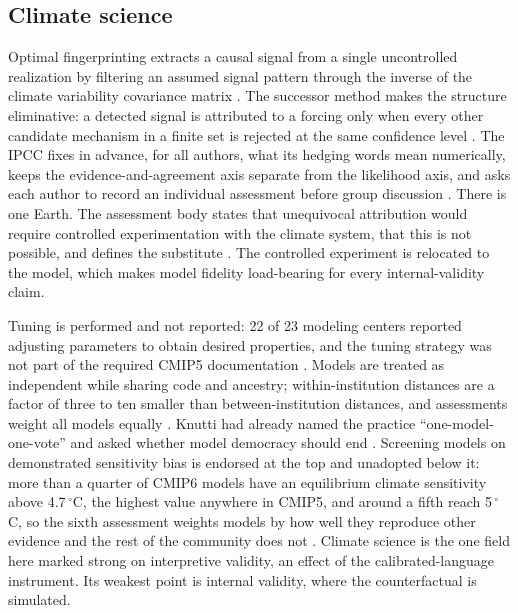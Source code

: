 \documentclass{article}
\begin{document}
\subsection{Climate science}

Optimal fingerprinting extracts a causal signal from a single uncontrolled realization by filtering an assumed signal pattern through the inverse of the climate variability covariance matrix \citep{hasselmann1993optimal}. The successor method makes the structure eliminative: a detected signal is attributed to a forcing only when every other candidate mechanism in a finite set is rejected at the same confidence level \citep{hasselmann1997multi}. The IPCC fixes in advance, for all authors, what its hedging words mean numerically, keeps the evidence-and-agreement axis separate from the likelihood axis, and asks each author to record an individual assessment before group discussion \citep{mastrandrea2010guidance}. There is one Earth. The assessment body states that unequivocal attribution would require controlled experimentation with the climate system, that this is not possible, and defines the substitute \citep{hegerl2007understanding}. The controlled experiment is relocated to the model, which makes model fidelity load-bearing for every internal-validity claim.

Tuning is performed and not reported: 22 of 23 modeling centers reported adjusting parameters to obtain desired properties, and the tuning strategy was not part of the required CMIP5 documentation \citep{hourdin2017art}. Models are treated as independent while sharing code and ancestry; within-institution distances are a factor of three to ten smaller than between-institution distances, and assessments weight all models equally \citep{knutti2013climate}. Knutti had already named the practice ``one-model-one-vote'' and asked whether model democracy should end \citep{knutti2010end}. Screening models on demonstrated sensitivity bias is endorsed at the top and unadopted below it: more than a quarter of CMIP6 models have an equilibrium climate sensitivity above 4.7\,$^\circ$C, the highest value anywhere in CMIP5, and around a fifth reach 5\,$^\circ$C, so the sixth assessment weights models by how well they reproduce other evidence and the rest of the community does not \citep{hausfather2022climate}. Climate science is the one field here marked strong on interpretive validity, an effect of the calibrated-language instrument. Its weakest point is internal validity, where the counterfactual is simulated.
\end{document}
